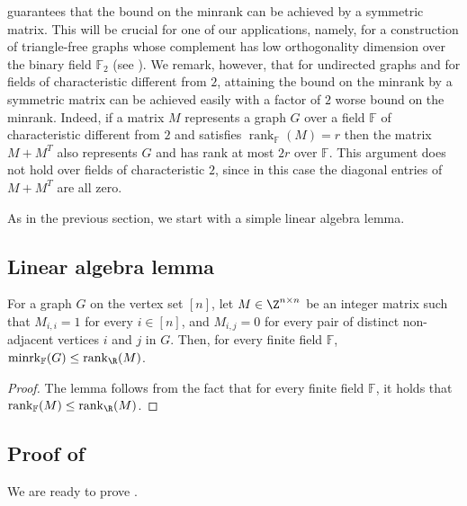 \documentclass{toc}
\newcommand{\Fset}{\mathbb{F}}
\newcommand{\rank}{\mathop{\mathrm{rank}}}
\newcommand{\minrank}{\mathop{\mathrm{minrk}}}
\begin{document}
\begin{remark}\label{remark:symmetric}
 guarantees that the bound on the minrank can be achieved by a symmetric matrix.
This will be crucial for one of our applications, namely, for a construction of triangle-free graphs whose complement has low orthogonality dimension over the binary field $\Fset_2$ (see ).
We remark, however, that for undirected graphs and for fields of characteristic different from $2$, attaining the bound on the minrank by a symmetric matrix can be achieved easily with a factor of $2$ worse bound on the minrank. Indeed, if a matrix $M$ represents a graph $G$ over a field $\Fset$ of characteristic different from $2$ and satisfies ${\rank}_{\Fset}(M) = r$ then the matrix $M+M^T$ also represents $G$ and has rank at most $2r$ over $\Fset$.
This argument does not hold over fields of characteristic $2$, since in this case the diagonal entries of $M+M^T$ are all %
zero.  %
\end{remark}

As in the previous section, we start with a simple linear algebra lemma.

\subsection{Linear algebra lemma}

\begin{lemma}\label{lemma:rankp_R}
  For a graph $G$ on the vertex set $[n]$, let $M \in \Z^{n \times n}$ be an integer matrix such that $M_{i,i}=1$ for every $i \in [n]$, and $M_{i,j} = 0$ for every
pair of  %
distinct non-adjacent vertices $i$ and $j$ in $G$. Then, for every finite field $\Fset$, ${\minrank}_{\Fset}(G) \leq \rank_\R(M)$.
\end{lemma}

%
\begin{proof}
The lemma follows from the fact that for every finite field $\Fset$, it holds that $\rank_{\Fset} (M) \leq \rank_{\R} (M)$.
\end{proof}

%
%
%
%
%
%
%
%
%
%
%
%
%
%
%
%
%
%
%
%
%
%
%
%
%
%
%
%
%
%
%

\subsection{Proof of }

We are ready to prove .
\end{document}
